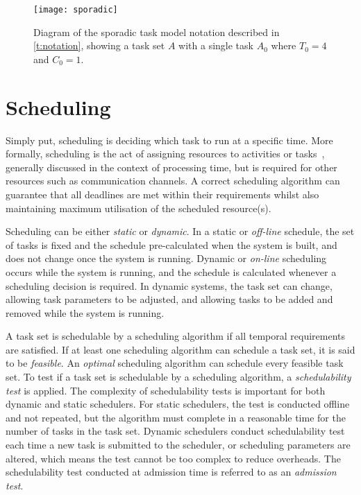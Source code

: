 \begin{figure}[h!tb]
	\begin{center}
		\leavevmode
		\texttt{[image: sporadic]}
        \caption{Diagram of the sporadic task model notation described in \cref{t:notation}, showing
        a task set $A$ with a single task $A_{0}$ where $T_{0} = 4$ and $C_{0} = 1$.}
		\label{fig:fp-schedule}
	\end{center}
\end{figure}


\section{Scheduling}
\label{sec:rt-scheduling}

Simply put, scheduling is deciding which task to run at a specific time. More formally, scheduling
is the act of assigning resources to activities or tasks~\citep{Baruah_CPV_96}, generally discussed
in the context of processing time, but is required for other resources such as communication
channels.  A correct scheduling algorithm  can guarantee that all deadlines are met within their
requirements whilst also maintaining maximum utilisation of the scheduled resource(s).

Scheduling can be either \emph{static} or \emph{dynamic}. In a static or \emph{off-line} schedule, 
the set of tasks is fixed and the schedule pre-calculated when the system is built, and does not
change once the system is running. 
Dynamic or \emph{on-line} scheduling occurs while the system is running, and the schedule is
calculated whenever a scheduling decision is required. In dynamic systems, the task set can change,
allowing task parameters to be adjusted, and allowing tasks to be added and removed while the system
is running.

A task set is schedulable by a scheduling algorithm if all temporal requirements are satisfied.
If at least one scheduling algorithm can schedule a task set, it is said to be \emph{feasible}.
An \emph{optimal} scheduling algorithm can schedule every feasible task set.
To test if a task set is schedulable by a scheduling algorithm, a \emph{schedulability test} is applied.
The complexity of schedulability tests is important for both dynamic and static schedulers. For
static schedulers, the test is conducted offline and not repeated, but the algorithm must complete
in a reasonable time for the number of tasks in the task set. Dynamic schedulers conduct
schedulability test each time a new task is submitted to the scheduler, or scheduling parameters are
altered, which means the test cannot be too complex to reduce overheads. The schedulability test conducted at admission time is
referred to as an \emph{admission test}.

